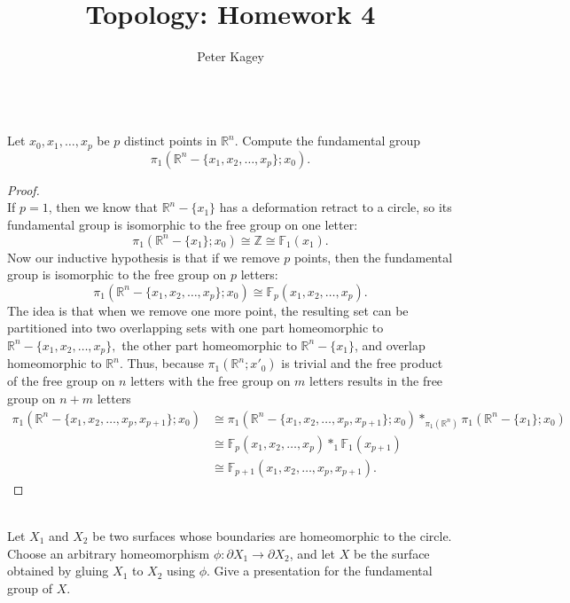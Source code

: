 \documentclass{article}
\newenvironment{problem}[2][Problem]{\begin{trivlist}
\item[\hskip \labelsep {\bfseries #1}\hskip \labelsep {\bfseries #2.}]}{\end{trivlist}}
\begin{document}
\title{Topology: Homework 4}
\author{Peter Kagey}

\maketitle

\begin{problem}{1} \text{} \\
  Let $x_0, x_1, \hdots, x_p$ be $p$ distinct points in $\mathbb R^n$.
  Compute the fundamental group \[
    \pi_1(\mathbb R^n - \{ x_1, x_2, \hdots, x_p\}; x_0).
  \]
\end{problem}

\begin{proof} \text{} \\
  If $p = 1$, then we know that $\mathbb R^n - \{ x_1 \}$ has a deformation
  retract to a circle, so its fundamental group is isomorphic to the free group
  on one letter: \[
    \pi_1(\mathbb R^n - \{ x_1 \}; x_0) \cong \mathbb Z \cong \mathbb F_1(x_1).
  \]
  Now our inductive hypothesis is that if we remove $p$ points, then the
  fundamental group is isomorphic to the free group on $p$ letters: \[
    \pi_1(\mathbb R^n - \{ x_1, x_2, \hdots, x_p\}; x_0) \cong
    \mathbb F_p(x_1, x_2, \hdots, x_p).
  \]
  The idea is that when we remove one more point, the resulting set can be
  partitioned into two overlapping sets with one part homeomorphic to
  $\mathbb R^n - \{ x_1, x_2, \hdots, x_p \},$
  the other part homeomorphic to
  $\mathbb R^n - \{ x_1 \}$,
  and overlap homeomorphic to $\mathbb R^n$.
  Thus, because $\pi_1(\mathbb R^n; x'_0)$ is trivial and the free product of
  the free group on $n$ letters with the free group on $m$ letters results in
  the free group on $n + m$ letters
  \begin{align*}
    \pi_1(\mathbb R^n - \{ x_1, x_2, \hdots, x_p, x_{p + 1}\}; x_0) &\cong
    \pi_1(\mathbb R^n - \{ x_1, x_2, \hdots, x_p, x_{p + 1}\}; x_0)
    *_{\pi_1(\mathbb R^n)}
    \pi_1(\mathbb R^n - \{ x_1 \}; x_0) \\
    &\cong \mathbb F_p(x_1, x_2, \hdots, x_p) *_1 \mathbb F_1(x_{p+1}) \\
    &\cong \mathbb F_{p+1}(x_1, x_2, \hdots, x_p, x_{p + 1}).
  \end{align*}
\end{proof}
\pagebreak
\begin{problem}{2} \text{} \\
  Let $X_1$ and $X_2$ be two surfaces whose boundaries are homeomorphic to the
  circle. Choose an arbitrary homeomorphism
  $\phi\colon \partial X_1 \rightarrow \partial X_2$, and let $X$ be the surface
  obtained by gluing $X_1$ to $X_2$ using $\phi$. Give a presentation for the
  fundamental group of $X$.
\end{problem}
\end{document}
